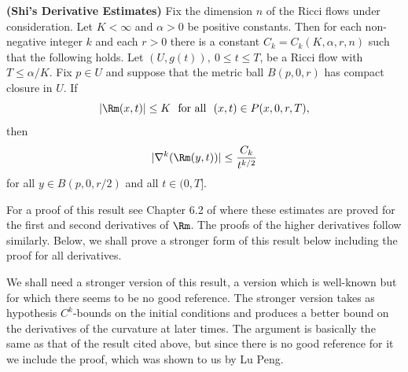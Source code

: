 \begin{theorem}\label{thm:shi-derivative-estimates}
\label{shi}

{\bf (Shi's Derivative Estimates)} Fix the dimension $n$ of the Ricci flows under consideration. Let
$K<\infty$ and $\alpha>0$ be positive constants.  Then for each
non-negative integer $k$ and each $r>0$ there is a constant
$C_k=C_k(K,\alpha,r,n)$ such that the following holds. Let
$(U,g(t)),\ 0\le t\le T$, be a Ricci flow with $T\le \alpha/K$.
Fix $p\in U$ and suppose that the metric ball $B(p,0,r)$ has compact
closure in $U$. If
$$|\Rm(x,t)|\le K\ \ \text{for all }\ (x,t)\in P(x,0,r,T),$$
then
$$|\nabla^k(\Rm(y,t))|\le \frac{C_k}{t^{k/2}}$$
for all $y\in B(p,0,r/2)$ and all $t\in(0,T]$.
\end{theorem}

For a proof of this result see Chapter 6.2 of \cite{ChowLuNi} where
these estimates are proved for the first and second derivatives of
$\Rm$. The proofs of the higher derivatives follow similarly.  Below, we
shall prove a stronger form of this result below including the proof
for all derivatives.

We shall need a stronger version of this result, a version which is
well-known but for which there seems to be no good reference. The
stronger version takes as hypothesis $C^k$-bounds on the
initial conditions and produces a better bound on the derivatives of
the curvature at later times. The argument is basically the same as
that of the result cited above, but since there is no good reference
for it we include the proof, which was shown to us by Lu Peng.





